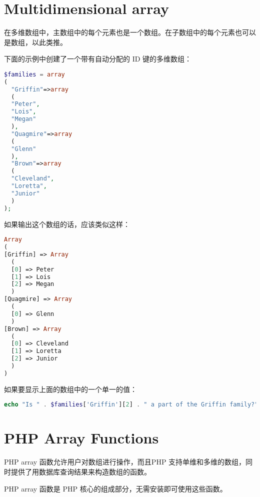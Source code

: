 \section{Multidimensional array}



在多维数组中，主数组中的每个元素也是一个数组。在子数组中的每个元素也可以是数组，以此类推。


下面的示例中创建了一个带有自动分配的 ID 键的多维数组：


\begin{lstlisting}[language=PHP]
$families = array
(
  "Griffin"=>array
  (
  "Peter",
  "Lois",
  "Megan"
  ),
  "Quagmire"=>array
  (
  "Glenn"
  ),
  "Brown"=>array
  (
  "Cleveland",
  "Loretta",
  "Junior"
  )
);
\end{lstlisting}

如果输出这个数组的话，应该类似这样：


\begin{lstlisting}[language=PHP]
Array
(
[Griffin] => Array
  (
  [0] => Peter
  [1] => Lois
  [2] => Megan
  )
[Quagmire] => Array
  (
  [0] => Glenn
  )
[Brown] => Array
  (
  [0] => Cleveland
  [1] => Loretta
  [2] => Junior
  )
)
\end{lstlisting}

如果要显示上面的数组中的一个单一的值：


\begin{lstlisting}[language=PHP]
echo "Is " . $families['Griffin'][2] . " a part of the Griffin family?"; 
\end{lstlisting}





\section{PHP Array Functions}


PHP array 函数允许用户对数组进行操作，而且PHP 支持单维和多维的数组，同时提供了用数据库查询结果来构造数组的函数。

PHP array 函数是 PHP 核心的组成部分，无需安装即可使用这些函数。



